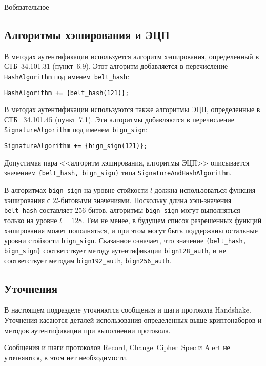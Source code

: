 \begin{appendix}{В}{обязательное}
\subsection{Алгоритмы хэширования и ЭЦП}\label{BSUITES.3.3}

В методах аутентификации используется алгоритм хэширования, определенный в 
СТБ~34.101.31 (пункт~6.9). Этот алгоритм добавляется в перечисление 
\lstinline{HashAlgorithm} под именем~\lstinline{belt_hash}:
\begin{lstlisting}
HashAlgorithm += {belt_hash(121)};
\end{lstlisting}
 
В методах аутентификации используются также алгоритмы ЭЦП, определенные в СТБ~
34.101.45 (пункт~7.1). Эти алгоритмы добавляются в перечисление 
\lstinline{SignatureAlgorithm} под именем~\lstinline{bign_sign}: 
\begin{lstlisting}
SignatureAlgorithm += {bign_sign(121)};
\end{lstlisting}

Допустимая пара <<алгоритм хэширования, алгоритмы ЭЦП>> описывается значением 
\lstinline|{belt_hash, bign_sign}| типа \lstinline{SignatureAndHashAlgorithm}. 

В алгоритмах \lstinline{bign_sign} на уровне стойкости $l$ должна
использоваться функция хэширования с $2l$-битовыми значениями. Поскольку
длина хэш-значения \lstinline{belt_hash} составляет 256 битов, алгоритмы
\lstinline{bign_sign} могут выполняться только на уровне $l = 128$. Тем не
менее, в будущем список разрешенных функций хэширования может пополняться,
и при этом могут быть поддержаны остальные уровни стойкости
\lstinline{bign_sign}. Сказанное означает, что значение
\lstinline|{belt_hash, bign_sign}| соответствует методу аутентификации
\lstinline{bign128_auth}, и не соответствует методам
\lstinline{bign192_auth}, \lstinline{bign256_auth}.

\label{BSUITES.4}

\subsection{Уточнения}\label{BSUITES.4.1}

В настоящем подразделе уточняются сообщения и шаги протокола
Handshake. Уточнения касаются деталей использования
определенных выше криптонаборов и методов аутентификации при выполнении
протокола.

Сообщения и шаги протоколов Record, 
Change~Cipher~Spec и Alert не уточняются, в этом 
нет необходимости. 


\end{appendix}
